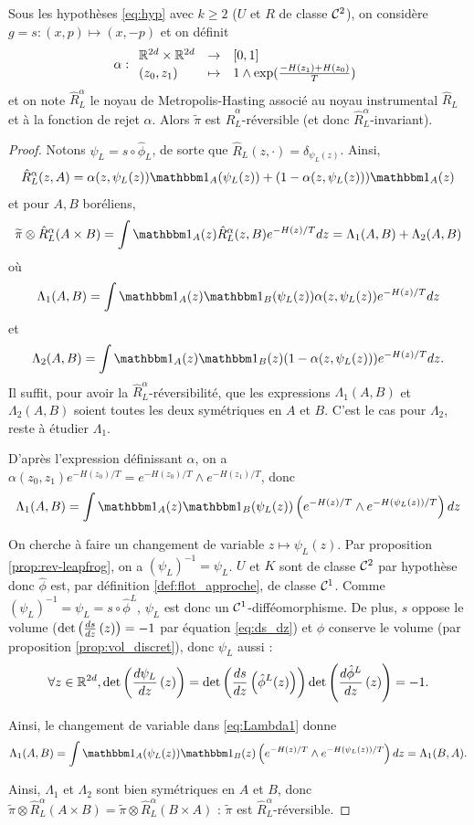 \documentclass[10pt,a4paper]{article}
\begin{document}
\begin{Prop}[réversibilité]\label{prop:rever_discret}
	Sous les hypothèses \eqref{eq:hyp} avec $k \geq 2$ ($U$ et $R$ de classe $\mathcal{C}^2$), on considère $g = s : (x, p) \mapsto (x,-p)$ et on définit
	$$
	\alpha : { \begin{array}{lcl} 
	\mathbb{R}^{2d} \times \mathbb{R}^{2d} & \to & [0,1] \\
	(z_0, z_1) & \mapsto & 1 \wedge \exp(\frac{-H(z_1)+H(z_0)}{T})
	 \end{array} }
	$$
	et on note $\hat{R}_L^\alpha$ le noyau de Metropolis-Hasting associé au noyau instrumental $\hat{R}_L$ et à la fonction de rejet $\alpha$. Alors $\widetilde \pi$ est $\hat{R}_L^\alpha$-réversible (et donc $\hat{R}_L^\alpha$-invariant). 
\end{Prop}
\begin{proof}
	Notons $\psi_L = s \circ \hat \phi_L$, de sorte que $\hat{R}_L(z,\cdot) = \delta_{\psi_L(z)}$. Ainsi,
	$$
	\hat{R}_L^\alpha(z,A) = \alpha(z,\psi_L(z)) \ind_A(\psi_L(z)) + (1-\alpha(z,\psi_L(z))) \ind_A(z)
	$$
	et pour $A,B$ boréliens,
	$$
	\widetilde \pi \otimes \hat{R}_L^\alpha (A \times B)
	=
	\int \ind_A(z) \hat{R}_L^\alpha(z,B) e^{-H(z)/T} dz
	=
	\Lambda_1(A,B) + \Lambda_2(A,B)
	$$
	où
	$$
	\Lambda_1(A,B) = \int \ind_A(z) \ind_B(\psi_L(z)) \alpha(z,\psi_L(z)) e^{-H(z)/T} dz
	$$
	et
	$$
	\Lambda_2(A,B) = \int \ind_A(z) \ind_B(z) (1-\alpha(z,\psi_L(z))) e^{-H(z)/T} dz.
	$$
	Il suffit, pour avoir la $\hat{R}_L^\alpha$-réversibilité, que les expressions $\Lambda_1(A,B)$ et $\Lambda_2(A,B)$ soient toutes les deux symétriques en $A$ et $B$. C'est le cas pour $\Lambda_2$, reste à étudier $\Lambda_1$.

	D'après l'expression définissant $\alpha$, on a $\alpha(z_0,z_1) e^{-H(z_0)/T} = e^{-H(z_0)/T} \wedge e^{-H(z_1)/T}$, donc
	\begin{equation}\label{eq:Lambda1}
	\Lambda_1(A,B) = \int \ind_A(z) \ind_B(\psi_L(z)) \left( e^{-H(z)/T} \wedge e^{-H(\psi_L(z))/T} \right) dz
	\end{equation}

	On cherche à faire un changement de variable $z \mapsto \psi_L(z)$. Par proposition \ref{prop:rev-leapfrog}, on a $(\psi_L)^{-1} = \psi_L$. $U$ et $K$ sont de classe $\mathcal{C}^2$ par hypothèse donc $\hat \phi$ est, par définition \ref{def:flot_approche}, de classe $\mathcal{C}^1$. Comme $(\psi_L)^{-1} = \psi_L = s \circ \hat \phi^L$, $\psi_L$ est donc un $\mathcal{C}^1$-difféomorphisme. De plus, $s$ oppose le volume ($\det \left( \frac{d s}{d z} \left( z \right) \right) = -1$ par équation \eqref{eq:ds_dz}) et $\hat \phi$ conserve le volume (par proposition \ref{prop:vol_discret}), donc $\psi_L$ aussi :
	$$
	\forall z \in \mathbb{R}^{2d}, \det \left( \frac{d \psi_L}{d z} \left( z \right) \right) = \det \left( \frac{d s}{d z} \left( \hat \phi^L(z) \right) \right) \det \left( \frac{d \hat \phi^L}{d z} \left( z \right) \right) = -1.
	$$

	Ainsi, le changement de variable dans \eqref{eq:Lambda1} donne
	$$
	\Lambda_1(A,B) = \int \ind_A(\psi_L(z)) \ind_B(z) \left( e^{-H(z)/T} \wedge e^{-H(\psi_L(z))/T} \right) dz = \Lambda_1(B,A).
	$$

	Ainsi, $\Lambda_1$ et $\Lambda_2$ sont bien symétriques en $A$ et $B$, donc $\widetilde \pi \otimes \hat{R}_L^\alpha (A \times B) = \widetilde \pi \otimes \hat{R}_L^\alpha (B \times A)$ : $\widetilde \pi$ est $\hat{R}_L^\alpha$-réversible.
\end{proof}
\end{document}
